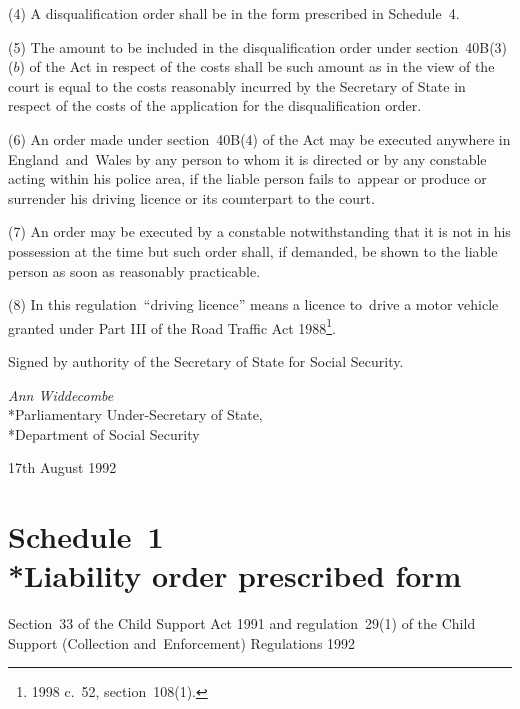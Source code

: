 \documentclass[12pt,a4paper]{article}
\begin{document}
(4) A disqualification order shall be in the form prescribed in Schedule~4.

(5) The amount to be included in the disqualification order under section~40B(3)($b$)  of the Act in respect of the costs shall be such amount as in the view of the court is equal to the costs reasonably incurred by the Secretary of State in respect of the costs of the application for the disqualification order.

(6) An order made under section~40B(4) of the Act may be executed anywhere in England~and~Wales by any person to whom it is directed or by any constable acting within his police area, if the liable person fails to~appear or produce or surrender his driving licence or its counterpart to the court.

(7) An order may be executed by a constable notwithstanding that it is not in his possession at the time but such order shall, if demanded, be shown to the liable person as soon as reasonably practicable.

(8) In this regulation~“driving licence” means a licence to~drive a motor vehicle granted under Part III of the Road Traffic Act 1988\footnote{1998 c.\ 52, section~108(1).}.


\bigskip

Signed by authority of the Secretary of State for Social Security.

{\raggedleft
\emph{Ann Widdecombe}\\*Parliamentary Under-Secretary of State,\\*Department of Social Security

}

17th August 1992

\small

\part[Schedule~1 --- Liability order prescribed form]{Schedule~1\\*Liability order prescribed form}

\renewcommand\parthead{--- Schedule~1}

\noindent
Section~33 of the Child Support Act 1991 and regulation~29(1) of the Child Support (Collection and~Enforcement) Regulations 1992
\end{document}
